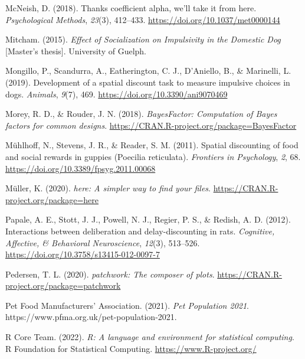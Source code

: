 \documentclass[
  pub,floatsintext]{apa6}
\newlength{\cslhangindent}
\newlength{\cslentryspacingunit} %
\newenvironment{CSLReferences}[2] %
 {%
  \setlength{\parindent}{0pt}
  \ifodd #1
  \let\oldpar\par
  \def\par{\hangindent=\cslhangindent\oldpar}
  \fi
  \setlength{\parskip}{#2\cslentryspacingunit}
 }%
 {}
\begin{document}
\begin{CSLReferences}{1}{0}
\leavevmode{}%
McNeish, D. (2018). Thanks coefficient alpha, we'll take it from here. \emph{Psychological Methods}, \emph{23}(3), 412--433. \url{https://doi.org/10.1037/met0000144}

\leavevmode{}%
Mitcham. (2015). \emph{Effect of {Socialization} on {Impulsivity} in the {Domestic Dog}} {[}Master's thesis{]}. University of Guelph.

\leavevmode{}%
Mongillo, P., Scandurra, A., Eatherington, C. J., D'Aniello, B., \& Marinelli, L. (2019). Development of a spatial discount task to measure impulsive choices in dogs. \emph{Animals}, \emph{9}(7), 469. \url{https://doi.org/10.3390/ani9070469}

\leavevmode{}%
Morey, R. D., \& Rouder, J. N. (2018). \emph{BayesFactor: Computation of {Bayes} factors for common designs}. \url{https://CRAN.R-project.org/package=BayesFactor}

\leavevmode{}%
Mühlhoff, N., Stevens, J. R., \& Reader, S. M. (2011). Spatial discounting of food and social rewards in guppies ({Poecilia} reticulata). \emph{Frontiers in Psychology}, \emph{2}, 68. \url{https://doi.org/10.3389/fpsyg.2011.00068}

\leavevmode{}%
Müller, K. (2020). \emph{{here}: A simpler way to find your files}. \url{https://CRAN.R-project.org/package=here}

\leavevmode{}%
Papale, A. E., Stott, J. J., Powell, N. J., Regier, P. S., \& Redish, A. D. (2012). Interactions between deliberation and delay-discounting in rats. \emph{Cognitive, Affective, \& Behavioral Neuroscience}, \emph{12}(3), 513--526. \url{https://doi.org/10.3758/s13415-012-0097-7}

\leavevmode{}%
Pedersen, T. L. (2020). \emph{{patchwork}: The composer of plots}. \url{https://CRAN.R-project.org/package=patchwork}

\leavevmode{}%
Pet Food Manufacturers' Association. (2021). \emph{Pet {Population} 2021}. https://www.pfma.org.uk/pet-population-2021.

\leavevmode{}%
R Core Team. (2022). \emph{R: A language and environment for statistical computing}. R Foundation for Statistical Computing. \url{https://www.R-project.org/}


\end{CSLReferences}
\end{document}
